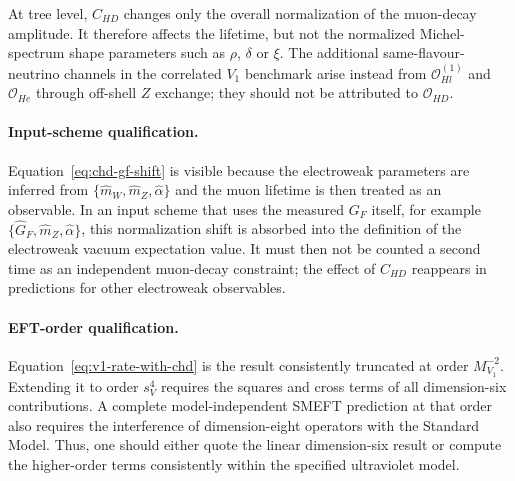 At tree level, $C_{HD}$ changes only the overall normalization of the
muon-decay amplitude.  It therefore affects the lifetime, but not the
normalized Michel-spectrum shape parameters such as $\rho$, $\delta$ or
$\xi$.  The additional same-flavour-neutrino channels in the correlated
$V_1$ benchmark arise instead from $\mathcal O_{Hl}^{(1)}$ and
$\mathcal O_{He}$ through off-shell $Z$ exchange; they should not be
attributed to $\mathcal O_{HD}$.

\paragraph{Input-scheme qualification.}
Equation~\eqref{eq:chd-gf-shift} is visible because the electroweak
parameters are inferred from
$\{\widehat m_W,\widehat m_Z,\widehat\alpha\}$ and the muon lifetime is
then treated as an observable.  In an input scheme that uses the measured
$G_F$ itself, for example
$\{\widehat G_F,\widehat m_Z,\widehat\alpha\}$, this normalization shift
is absorbed into the definition of the electroweak vacuum expectation
value.  It must then not be counted a second time as an independent
muon-decay constraint; the effect of $C_{HD}$ reappears in predictions for
other electroweak observables.

\paragraph{EFT-order qualification.}
Equation~\eqref{eq:v1-rate-with-chd} is the result consistently truncated
at order $M_{V_1}^{-2}$.  Extending it to order $s_V^4$ requires the
squares and cross terms of all dimension-six contributions.  A complete
model-independent SMEFT prediction at that order also requires the
interference of dimension-eight operators with the Standard Model.  Thus,
one should either quote the linear dimension-six result or compute the
higher-order terms consistently within the specified ultraviolet model.

